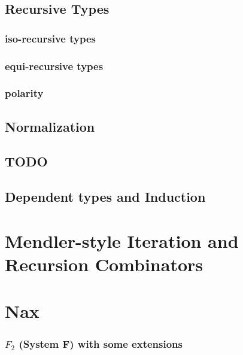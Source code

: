 \documentclass[a4paper,12pt]{book}
\begin{document}
\chapter{Recursive Types}
\section{iso-recursive types}
\section{equi-recursive types}
\section{polarity}
\section{}
\chapter{Normalization}
\chapter{TODO}
\chapter{Dependent types and Induction}

\part{Mendler-style Iteration and Recursion Combinators}

\part{Nax}

\section{$F_2$ (System F) with some extensions}
\end{document}

